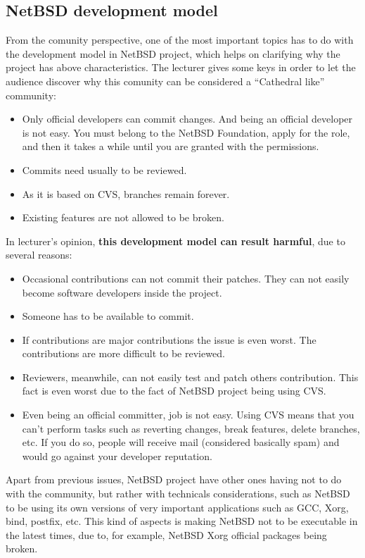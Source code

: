 \documentclass[11pt]{article}
\begin{document}
\subsection{NetBSD development model}
From the comunity perspective, one of the most important topics has to do with the development model in NetBSD project, which helps on clarifying why the project has above characteristics. The lecturer gives some keys in order to let the audience discover why this comunity can be considered a ``Cathedral like'' community:
\begin{itemize}\itemsep0pt
\item{Only official developers can commit changes}. And being an official developer is not easy. You must belong to the NetBSD Foundation, apply for the role, and then it takes a while until you are granted with the permissions.
\item{Commits need usually to be reviewed}.
\item{As it is based on CVS, branches remain forever}.
\item{Existing features are not allowed to be broken}.
\end{itemize}
In lecturer's opinion, \textbf{this development model can result harmful}, due to several reasons:
\begin{itemize}
\item{Occasional contributions can not commit their patches}. They can not easily become software developers inside the project.
\item{Someone has to be available to commit}.
\item{If contributions are major contributions the issue is even worst}. The contributions are more difficult to be reviewed.
\item{Reviewers, meanwhile, can not easily test and patch others contribution}. This fact is even worst due to the fact of NetBSD project being using CVS.
\item{Even being an official committer, job is not easy}. Using CVS means that you can't perform tasks such as reverting changes, break features, delete branches, etc. If you do so, people will receive mail (considered basically spam) and would go against your developer reputation.
\end{itemize}
Apart from previous issues, NetBSD project have other ones having not to do with the community, but rather with technicals considerations, such as NetBSD to be using its own versions of very important applications such as GCC, Xorg, bind, postfix, etc. This kind of aspects is making NetBSD not to be executable in the latest times, due to, for example, NetBSD Xorg official packages being broken.
\end{document}
